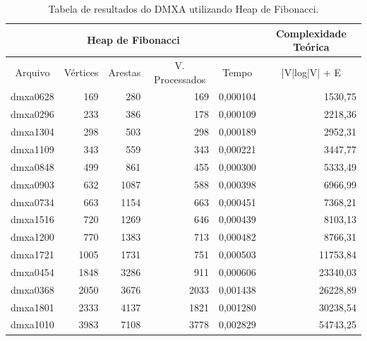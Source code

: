 \documentclass[
	12pt,				%
	oneside,			%
	a4paper,			%
	english,			%
	french,				%
	spanish,			%
	brazil,				%
	]{abntex2}
\begin{document}
\begin{table}[H]
  \centering    
  \begin{tabular}{|c|r|r|r|r|r|}
    \toprule
    \multicolumn{5}{|c|}{\cellcolor{gray!25}\textbf{Heap de Fibonacci}} & \multicolumn{1}{|c|}{\cellcolor{gray!25}\textbf{Complexidade Teórica}}\\
    \midrule
    \multicolumn{1}{|c|}{\cellcolor{gray!10}Arquivo} & \multicolumn{1}{|c|}{\cellcolor{gray!10}Vértices} & \multicolumn{1}{|c|}{\cellcolor{gray!10}Arestas} & \multicolumn{1}{|c|}{\cellcolor{gray!10}V. Processados} & \multicolumn{1}{|c|}{\cellcolor{gray!10}Tempo} & \multicolumn{1}{|c|}{\cellcolor{gray!10}|V|log|V| + E}\\
    \hline
    dmxa0628	&	169	&	280	&	169	&	0,000104	&	1530,75	\\
    \hline
    dmxa0296	&	233	&	386	&	178	&	0,000109	&	2218,36	\\
    \hline
    dmxa1304	&	298	&	503	&	298	&	0,000189	&	2952,31	\\
    \hline
    dmxa1109	&	343	&	559	&	343	&	0,000221	&	3447,77	\\
    \hline
    dmxa0848	&	499	&	861	&	455	&	0,000300	&	5333,49	\\
    \hline
    dmxa0903	&	632	&	1087	&	588	&	0,000398	&	6966,99	\\
    \hline
    dmxa0734	&	663	&	1154	&	663	&	0,000451	&	7368,21	\\
    \hline
    dmxa1516	&	720	&	1269	&	646	&	0,000439	&	8103,13	\\
    \hline
    dmxa1200	&	770	&	1383	&	713	&	0,000482	&	8766,31	\\
    \hline
    dmxa1721	&	1005	&	1731	&	751	&	0,000503	&	11753,84	\\
    \hline
    dmxa0454	&	1848	&	3286	&	911	&	0,000606	&	23340,03	\\
    \hline
    dmxa0368	&	2050	&	3676	&	2033	&	0,001438	&	26228,89	\\
    \hline
    dmxa1801	&	2333	&	4137	&	1821	&	0,001280	&	30238,54	\\
    \hline
    dmxa1010	&	3983	&	7108	&	3778	&	0,002829	&	54743,25	\\
    \hline
  \end{tabular}
  \caption{Tabela de resultados do DMXA utilizando Heap de Fibonacci.}  
  \label{tab:DmxaHeap}
\end{table}
\end{document}
